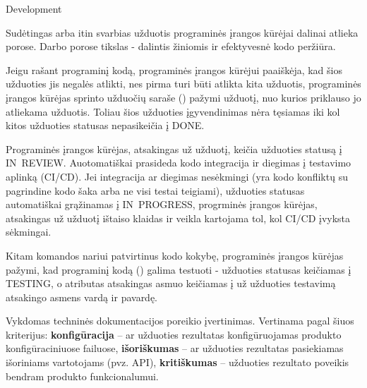 \begin{processTable}{Development}
{        \item Sudėtingas arba itin svarbias užduotis programinės įrangos kūrėjai dalinai atlieka porose. Darbo porose tikslas - dalintis žiniomis ir efektyvesnė kodo peržiūra.
        \label{IG:4}

        \item Jeigu rašant programinį kodą, programinės įrangos kūrėjui paaiškėja, kad šios užduoties jis negalės atlikti, nes pirma turi būti atlikta kita užduotis, programinės įrangos kūrėjas sprinto užduočių saraše () pažymi užduotį, nuo kurios priklauso jo atliekama užduotis. Toliau šios užduoties įgyvendinimas nėra tęsiamas iki kol kitos užduoties statusas nepasikeičia į DONE.
        \label{IG:3}

        \item Programinės įrangos kūrėjas, atsakingas už užduotį, keičia užduoties statusą į \mbox{IN~REVIEW}. Auotomatiškai prasideda kodo integracija ir diegimas į testavimo aplinką (CI/CD). Jei integracija ar diegimas nesėkmingi (yra kodo konfliktų su pagrindine kodo šaka arba ne visi testai teigiami), užduoties statusas automatiškai grąžinamas į \mbox{IN~PROGRESS}, progrminės įrangos kūrėjas, atsakingas už užduotį ištaiso klaidas ir veikla kartojama tol, kol CI/CD įvyksta sėkmingai.
        \label{IG:5}


        \item {}
        \label{IG:6}
        \item Kitam komandos nariui patvirtinus kodo kokybę, programinės įrangos kūrėjas pažymi, kad programinį kodą () galima testuoti - užduoties statusas keičiamas į TESTING, o atributas atsakingas asmuo  keičiamas į už užduoties testavimą atsakingo asmens vardą ir pavardę.  
        \label{IG:7}

        \item Vykdomas techninės dokumentacijos poreikio įvertinimas. Vertinama pagal šiuos kriterijus: \textbf{konfigūracija} -- ar užduoties rezultatas konfigūruojamas produkto konfigūraciniuose failuose, \textbf{išoriškumas} -- ar užduoties rezultatas pasiekiamas išoriniams vartotojams (pvz. API), \textbf{kritiškumas} -- užduoties rezultato poveikis bendram produkto funkcionalumui.

}
\end{processTable}
